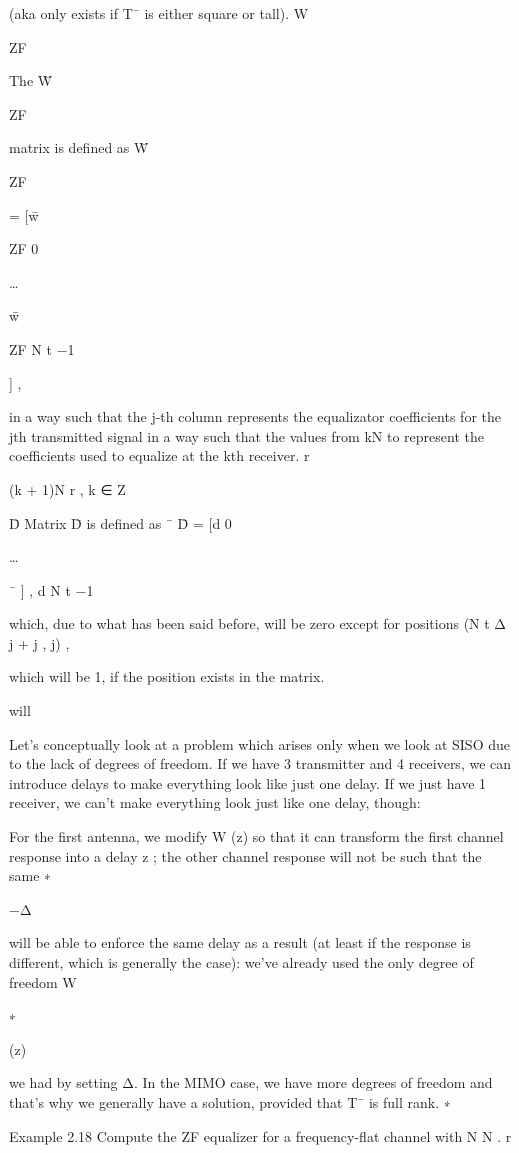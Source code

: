 {(aka only exists if T¯ is either square or tall).
​W

ZF

The W̄

ZF

matrix is defined as W̄

ZF

= [w̄

ZF 0

…

w̄

ZF N t −1

] ,

in a way such that the j-th column represents the equalizator coefficients for the jth transmitted signal in a way such that the values from kN to represent the coefficients used to equalize at the kth receiver.
r

(k + 1)N r , k ∈ Z

​D̄
Matrix D̄ is defined as
¯
D̄ = [d 0

…

¯
] ,
d N t −1

which, due to what has been said before, will be zero except for positions
(N t Δ j + j , j) ,

which will be 1, if the position exists in the matrix.

will

Let's conceptually look at a problem which arises only when we look at SISO due to the lack of degrees of freedom.
If we have 3 transmitter and 4 receivers, we can introduce delays to make everything look like just one delay.
If we just have 1 receiver, we can't make everything look just like one delay, though:

For the first antenna, we modify W (z) so that it can transform the first channel response into a delay z ; the other channel response will not be such that the same
∗

−Δ

will be able to enforce the same delay as a result (at least if the response is different, which is generally the case): we've already used the only degree of freedom W

∗

(z)

we had by setting Δ.
In the MIMO case, we have more degrees of freedom and that's why we generally have a solution, provided that T¯ is full rank.
∗

Example 2.18 Compute the ZF equalizer for a frequency-flat channel with N \geq N .
r

}
